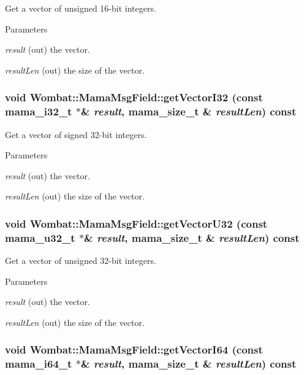 Get a vector of unsigned 16-\/bit integers. 
\begin{DoxyParams}{Parameters}
\item[{\em result}](out) the vector. \item[{\em resultLen}](out) the size of the vector. \end{DoxyParams}
\hypertarget{classWombat_1_1MamaMsgField_accae64c2f6040e208cf7feb405514eaa}{
\subsubsection[{getVectorI32}]{\setlength{\rightskip}{0pt plus 5cm}void Wombat::MamaMsgField::getVectorI32 (const mama\_\-i32\_\-t $\ast$\& {\em result}, \/  {\bf mama\_\-size\_\-t} \& {\em resultLen}) const}}
\label{classWombat_1_1MamaMsgField_accae64c2f6040e208cf7feb405514eaa}


Get a vector of signed 32-\/bit integers. 
\begin{DoxyParams}{Parameters}
\item[{\em result}](out) the vector. \item[{\em resultLen}](out) the size of the vector. \end{DoxyParams}
\hypertarget{classWombat_1_1MamaMsgField_a6f6297335f81da3243e1d3ccc3db9223}{
\subsubsection[{getVectorU32}]{\setlength{\rightskip}{0pt plus 5cm}void Wombat::MamaMsgField::getVectorU32 (const mama\_\-u32\_\-t $\ast$\& {\em result}, \/  {\bf mama\_\-size\_\-t} \& {\em resultLen}) const}}
\label{classWombat_1_1MamaMsgField_a6f6297335f81da3243e1d3ccc3db9223}


Get a vector of unsigned 32-\/bit integers. 
\begin{DoxyParams}{Parameters}
\item[{\em result}](out) the vector. \item[{\em resultLen}](out) the size of the vector. \end{DoxyParams}
\hypertarget{classWombat_1_1MamaMsgField_afe58f6065e1dc03bdab9d83882393b68}{
\subsubsection[{getVectorI64}]{\setlength{\rightskip}{0pt plus 5cm}void Wombat::MamaMsgField::getVectorI64 (const mama\_\-i64\_\-t $\ast$\& {\em result}, \/  {\bf mama\_\-size\_\-t} \& {\em resultLen}) const}}
\label{classWombat_1_1MamaMsgField_afe58f6065e1dc03bdab9d83882393b68}


